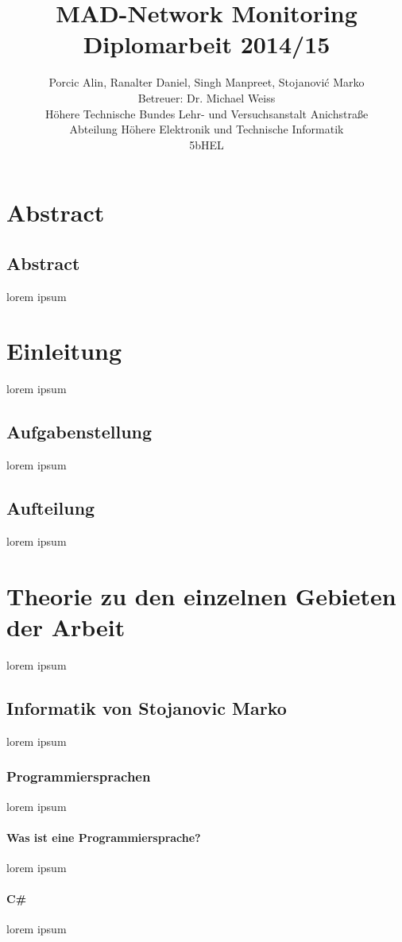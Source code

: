 \documentclass[12pt,a4paper]{report}
\title{MAD-Network Monitoring\\
Diplomarbeit 2014/15}
\author{Porcic Alin, Ranalter Daniel, Singh Manpreet, Stojanovi\'{c} Marko\\
Betreuer: Dr. Michael Weiss\\
Höhere Technische Bundes Lehr- und Versuchsanstalt Anichstraße\\
Abteilung Höhere Elektronik und Technische Informatik\\
5bHEL}
\begin{document}
\maketitle
\newpage

\tableofcontents
\newpage

\pagestyle{fancy}
\part{Abstract}
\chapter{Abstract}
\thispagestyle{fancy}

lorem ipsum

\part{Einleitung}
\thispagestyle{fancy}

lorem ipsum

\chapter{Aufgabenstellung}
lorem ipsum

\chapter{Aufteilung}
lorem ipsum 

\part{Theorie zu den einzelnen Gebieten der Arbeit}
lorem ipsum

\chapter{Informatik von Stojanovic Marko}
lorem ipsum

\section{Programmiersprachen}
lorem ipsum
\subsection{Was ist eine Programmiersprache?}
lorem ipsum
\subsection{C\#}
lorem ipsum
\end{document}

